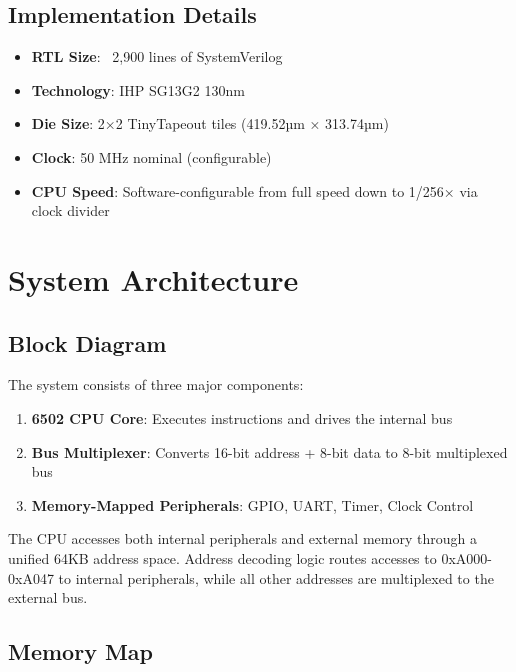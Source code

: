 \documentclass[11pt,a4paper]{article}
\begin{document}
\subsection{Implementation Details}

\begin{itemize}[leftmargin=*]
    \item \textbf{RTL Size}: ~2,900 lines of SystemVerilog
    \item \textbf{Technology}: IHP SG13G2 130nm
    \item \textbf{Die Size}: 2×2 TinyTapeout tiles (419.52µm × 313.74µm)
    \item \textbf{Clock}: 50 MHz nominal (configurable)
    \item \textbf{CPU Speed}: Software-configurable from full speed down to 1/256× via clock divider
\end{itemize}

\section{System Architecture}

\subsection{Block Diagram}

The system consists of three major components:

\begin{enumerate}
    \item \textbf{6502 CPU Core}: Executes instructions and drives the internal bus
    \item \textbf{Bus Multiplexer}: Converts 16-bit address + 8-bit data to 8-bit multiplexed bus
    \item \textbf{Memory-Mapped Peripherals}: GPIO, UART, Timer, Clock Control
\end{enumerate}

The CPU accesses both internal peripherals and external memory through a unified 64KB address space. Address decoding logic routes accesses to 0xA000-0xA047 to internal peripherals, while all other addresses are multiplexed to the external bus.

\subsection{Memory Map}
\end{document}
